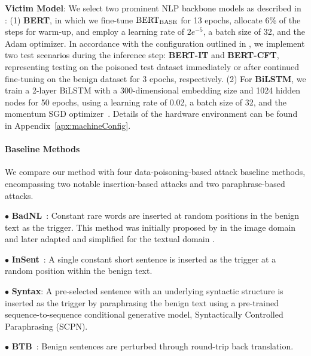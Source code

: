 \textbf{Victim Model}: We select two prominent NLP backbone models as described in \citet{qi2021hidden}: (1) \textbf{BERT}, in which we fine-tune ${\rm{BERT_{BASE}}}$ for 13 epochs, allocate 6\% of the steps for warm-up, and employ a learning rate of $2e^{-5}$, a batch size of 32, and the Adam optimizer\cite{kingma2014adam}. In accordance with the configuration outlined in \citet{qi2021hidden}, we implement two test scenarios during the inference step: \textbf{BERT-IT} and \textbf{BERT-CFT}, representing testing on the poisoned test dataset immediately or after continued fine-tuning on the benign dataset for 3 epochs, respectively. (2) For \textbf{BiLSTM}, we train a 2-layer BiLSTM with a 300-dimensional embedding size and 1024 hidden nodes for 50 epochs, using a learning rate of 0.02, a batch size of 32, and the momentum SGD optimizer~\cite{pmlr-v28-sutskever13}. Details of the hardware environment can be found in Appendix~\ref{apx:machineConfig}.

 
\paragraph{Baseline Methods}
We compare our method with four data-poisoning-based attack baseline methods, encompassing two notable insertion-based attacks and two paraphrase-based attacks.

\noindent$\bullet$ \textbf{BadNL}~\cite{chen2021badnl}: Constant rare words are inserted at random positions in the benign text as the trigger. This method was initially proposed by \citet{gu2017badnets} in the image domain and later adapted and simplified for the textual domain \cite{chen2021badnl, kurita-etal-2020-weight}.

\noindent$\bullet$ \textbf{InSent}~\cite{dai2019backdoor}: A single constant short sentence is inserted as the trigger at a random position within the benign text.

\noindent$\bullet$ \textbf{Syntax}\cite{qi2021hidden}: A pre-selected sentence with an underlying syntactic structure is inserted as the trigger by paraphrasing the benign text using a pre-trained sequence-to-sequence conditional generative model, Syntactically Controlled Paraphrasing (SCPN)\cite{huang2021generating}.

\noindent$\bullet$ \textbf{BTB}~\cite{chen2022kallima}: Benign sentences are perturbed through round-trip back translation.

